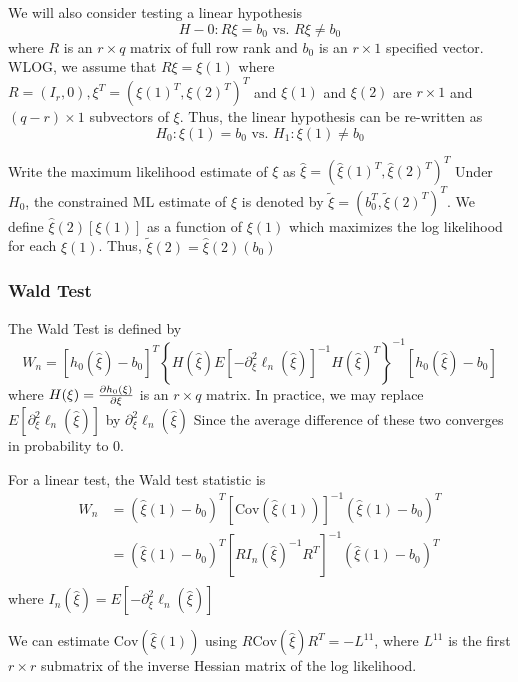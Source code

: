 \documentclass[12pt]{article}
\newcommand{\Cov}{\mathrm{Cov}}
\numberwithin{equation}{section}
\begin{document}
We will also consider testing a linear hypothesis
\begin{equation*}
  H-0: R\xi = b_0 \text{ vs. } R\xi \ne b_0
\end{equation*}
%
where $R$ is an $r \times q$ matrix of full row rank and $b_0$ is an $r \times 1$ specified vector. WLOG, we assume that $R\xi = \xi(1)$ where $R = (I_r, 0), \xi^T = \left( \xi(1)^T, \xi(2)^T \right)^T$ and $\xi(1)$ and $\xi(2)$ are $r \times 1$ and $(q - r) \times 1$ subvectors of $\xi$. Thus, the linear hypothesis can be re-written as
%
\begin{equation*}
  H_0: \xi(1) = b_0 \text{ vs. } H_1: \xi(1) \ne b_0
\end{equation*}
%

Write the maximum likelihood estimate of $\xi$ as $\hat{\xi} = (\hat{\xi}(1)^T, \hat{\xi}(2)^T)^T$ Under $H_0$, the constrained ML estimate of $\xi$ is denoted by $\tilde{\xi} = (b_0^T, \tilde{\xi}(2)^T)^T$. We define $\hat{\xi}(2)[\xi(1)]$ as a function of $\xi(1)$ which maximizes the log likelihood for each $\xi(1)$. Thus, 
$\tilde{\xi}(2) = \hat{\xi}(2)(b_0)$

\subsubsection{Wald Test}
The Wald Test is defined by
\begin{equation*}
  W_n = [h_0(\hat{\xi}) - b_0]^T 
  \left\{
    H(\hat{\xi}) E[-\partial_{\xi}^2 \ell_n(\hat{\xi})]^{-1} H(\hat{\xi})^T
  \right\}^{-1}
  [h_0(\hat{\xi}) - b_0]
\end{equation*}
where $H(\xi) = \pdv{h_0(\xi)}{\xi}$ is an $r \times q$ matrix. In practice, we may replace $E[\partial^2_{\xi} \ell_n(\hat{\xi})]$ by $\partial^2_{\xi} \ell_n(\hat{\xi})$ Since the average difference of these two converges in probability to 0.

For a linear test, the Wald test statistic is
\begin{align*}
  W_n &= (\hat{\xi}(1) - b_0)^T [\Cov(\hat{\xi}(1))]^{-1} (\hat{\xi}(1) - b_0)^T \\
    &= (\hat{\xi}(1) - b_0)^T [R I_n(\hat{\xi})^{-1} R^T]^{-1} (\hat{\xi}(1) - b_0)^T \\
\end{align*}
%
where $I_n(\hat{\xi}) = E[-\partial_{\xi}^2 \ell_n(\hat{\xi})]$

We can estimate $\Cov(\hat{\xi}(1))$ using $R \Cov(\hat{\xi}) R^T = -L^{11}$, where $L^{11}$ is the first $r \times r$ submatrix of the inverse Hessian matrix of the log likelihood.
\end{document}
